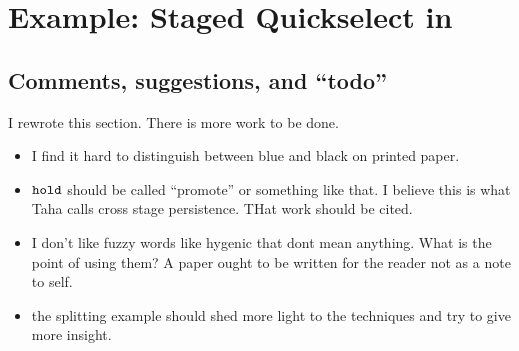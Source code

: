 \section {Example: Staged Quickselect in \texorpdfstring{\lang}{λ12}}
\label{sec:staging}


\subsection{Comments, suggestions, and ``todo''}
I rewrote this section.  There is more work to be done. 

\begin{itemize}
\item 
I find it hard to distinguish between blue and black on printed paper.

\item
${\tt hold}$ should be called ``promote'' or something like that. I
  believe this is what Taha calls cross stage persistence.  THat work should
  be cited.

\item
I don't like fuzzy words like hygenic that dont mean anything.
  What is the point of using them?  A paper ought to be written for
  the reader not as a note to self.

\item the splitting example should shed more light to the techniques
  and try to give more insight.
\end{itemize}



